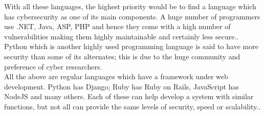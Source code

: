\documentclass[../main.tex]{subfiles}
\begin{document}
With all these languages, the highest priority would be to find a language which has cybersecurity as one of its main components. A huge number of programmers use .NET, Java, ASP, PHP and hence they come with a high number of vulnerabilities making them highly maintainable and certainly less secure.\cite{securelanguage}. Python which is another highly used programming language is said to have more security than some of its alternates; this is due to the huge community and preference of cyber researchers.\cite{topfivecyber}  \\[4mm]

All the above are regular languages which have a framework under web development. Python has Django; Ruby has Ruby on Rails, JavaScript has NodeJS and many others. Each of these can help develop a system with similar functions, but not all can provide the same levels of security, speed or scalability.\cite{djangovslaravel}\cite{webdev}. 
\end{document}
